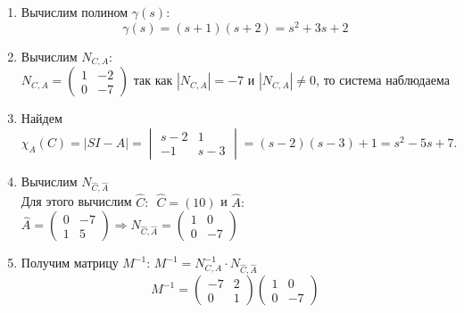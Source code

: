 \documentclass[../../TAU.tex]{subfiles}
\begin{document}
    \begin{enumerate}
        \item Вычислим полином $\gamma(s)$:
            $$\gamma(s)=(s+1)(s+2)=s^2+3s+2$$
        \item Вычислим $N_{C, A}$:\\
            $
                N_{C, A} =
                \begin{pmatrix}
                 1 & -2\\
                 0 & -7
                \end{pmatrix} 
            $
            так как $|N_{C, A}|=-7$ и $|N_{C, A}|\neq0$, то система наблюдаема
        \item Найдем 
        $
            \chi_A(C)=|SI-A|=
            \begin{vmatrix}
                s-2 & 1\\
                -1 & s-3
            \end{vmatrix}
            =(s-2)(s-3)+1=s^2-5s+7.
        $
        \item Вычислим $N_{\widehat C,\widehat A}$\\
            Для этого вычислим $\widehat C:$\ \quad$\widehat C=(10)$
            и $\widehat A:$\\
            $
                \widehat A=
                \begin{pmatrix}
                    0 & -7\\
                    1 & 5
                \end{pmatrix}
                \Rightarrow
                N_{\widehat C,\widehat A} =
                \begin{pmatrix}
                    1 & 0\\
                    0 & -7
                \end{pmatrix}
            $ 
        \item Получим матрицу $M^{-1}$: $M^{-1}=N_{C, A}^{-1}\cdot N_{\widehat C, \widehat A}$\\
            $$
                M^{-1}=
                \begin{pmatrix}
                    -7 & 2\\
                    0 & 1
                \end{pmatrix}
                \begin{pmatrix}
                    1 & 0\\
                    0 & -7
                \end{pmatrix}
$$
\end{enumerate}
\end{document}
